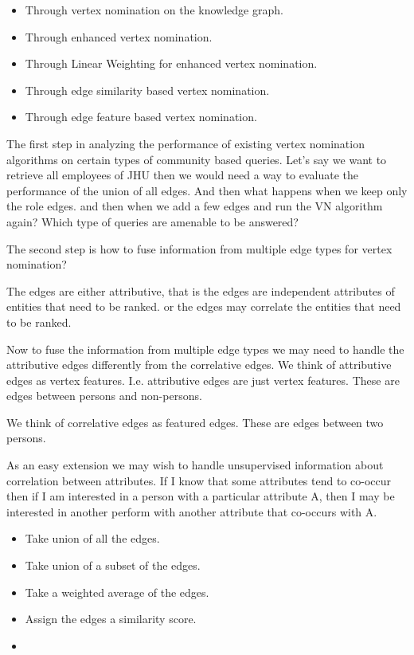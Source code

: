 \documentclass[paper=a4,fontsize=11pt]{scrartcl}
\numberwithin{equation}{section}    %
\numberwithin{figure}{section}      %
\numberwithin{table}{section}       %
\begin{document}
\begin{itemize}
\item Through vertex nomination on the knowledge graph.
\item Through enhanced vertex nomination.
\item Through Linear Weighting for enhanced vertex nomination.
\item Through edge similarity based vertex nomination.
\item Through edge feature based vertex nomination.
\end{itemize}

The first step in analyzing the performance of existing vertex nomination 
algorithms on certain types of community based queries. Let's say we want to 
retrieve all employees of JHU then we would need a way to evaluate the performance
of the union of all edges. And then what happens when we keep only the role edges.
and then when we add a few edges and run the VN algorithm again?
Which type of queries are amenable to be answered?

The second step is how to fuse information from multiple edge types for 
vertex nomination?

The edges are either attributive, that is the edges are independent attributes
of entities that need to be ranked. or the edges may correlate the entities that 
need to be ranked.

Now to fuse the information from multiple edge types we may need to handle the 
attributive edges differently from the correlative edges. 
We think of attributive edges as vertex features. 
I.e. attributive edges are just vertex features.
These are edges between persons and non-persons.

We think of correlative edges as featured edges. 
These are edges between two persons. 



As an easy extension we may wish to handle unsupervised information about 
correlation between attributes. If I know that some attributes tend to co-occur
then if I am interested in a person with a particular attribute A, then I 
may be interested in another perform with another attribute that co-occurs with A.

\begin{itemize}
\item Take union of all the edges.
\item Take union of a subset of the edges.
\item Take a weighted average of the edges.
\item Assign the edges a similarity score.
\item 
\end{itemize}
\end{document}
